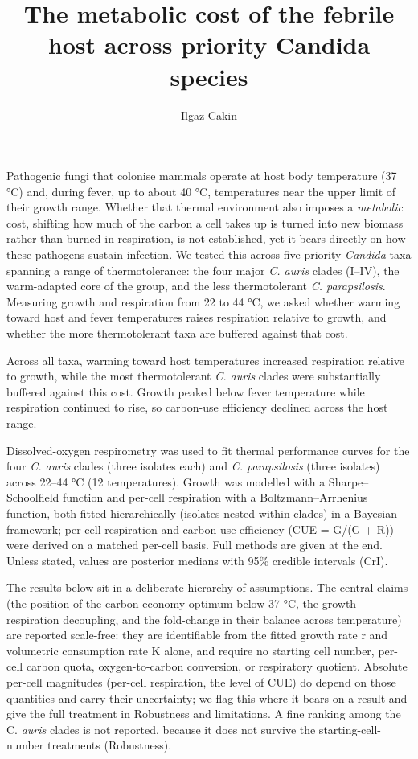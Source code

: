 \documentclass[
]{article}
\title{The metabolic cost of the febrile host across priority Candida
species}
\author{Ilgaz Cakin}
\date{}
\begin{document}
\maketitle


Pathogenic fungi that colonise mammals operate at host body temperature
(37 °C) and, during fever, up to about 40 °C, temperatures near the
upper limit of their growth range. Whether that thermal environment also
imposes a \emph{metabolic} cost, shifting how much of the carbon a cell
takes up is turned into new biomass rather than burned in respiration,
is not established, yet it bears directly on how these pathogens sustain
infection. We tested this across five priority \emph{Candida} taxa
spanning a range of thermotolerance: the four major \emph{C. auris}
clades (I--IV), the warm-adapted core of the group, and the less
thermotolerant \emph{C. parapsilosis}. Measuring growth and respiration
from 22 to 44 °C, we asked whether warming toward host and fever
temperatures raises respiration relative to growth, and whether the more
thermotolerant taxa are buffered against that cost.

Across all taxa, warming toward host temperatures increased respiration
relative to growth, while the most thermotolerant \emph{C. auris} clades
were substantially buffered against this cost. Growth peaked below fever
temperature while respiration continued to rise, so carbon-use
efficiency declined across the host range.

Dissolved-oxygen respirometry was used to fit thermal performance curves
for the four \emph{C. auris} clades (three isolates each) and \emph{C.
parapsilosis} (three isolates) across 22--44 °C (12 temperatures).
Growth was modelled with a Sharpe--Schoolfield function and per-cell
respiration with a Boltzmann--Arrhenius function, both fitted
hierarchically (isolates nested within clades) in a Bayesian framework;
per-cell respiration and carbon-use efficiency (CUE = G/(G + R)) were
derived on a matched per-cell basis. Full methods are given at the end.
Unless stated, values are posterior medians with 95\% credible intervals
(CrI).

The results below sit in a deliberate hierarchy of assumptions. The
central claims (the position of the carbon-economy optimum below 37 °C,
the growth-respiration decoupling, and the fold-change in their balance
across temperature) are reported scale-free: they are identifiable from
the fitted growth rate r and volumetric consumption rate K alone, and
require no starting cell number, per-cell carbon quota, oxygen-to-carbon
conversion, or respiratory quotient. Absolute per-cell magnitudes
(per-cell respiration, the level of CUE) do depend on those quantities
and carry their uncertainty; we flag this where it bears on a result and
give the full treatment in Robustness and limitations. A fine ranking
among the C. \emph{auris} clades is not reported, because it does not
survive the starting-cell-number treatments (Robustness).
\end{document}
